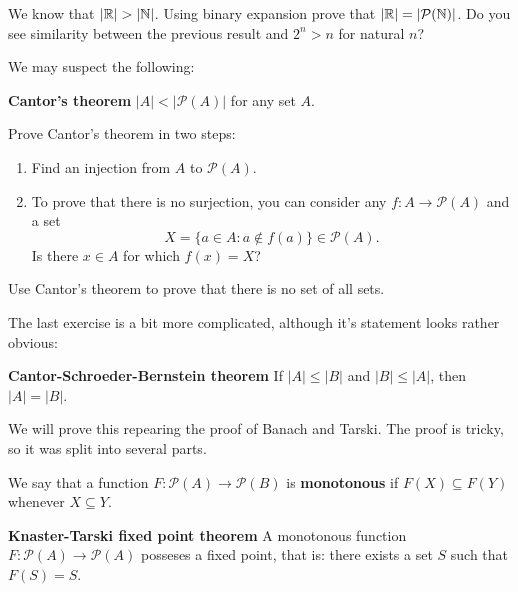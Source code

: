 \begin{exercise}
	We know that $|\mathbb R| > |\mathbb N|$. Using binary expansion prove that $|\mathbb R|=|\mathcal P(\mathbb N)|$. Do you see similarity between the previous result and $2^n > n$ for natural $n$?
\end{exercise}

We may suspect the following:

\begin{theorem}
\textbf{Cantor's theorem} $|A| < \left|\mathcal P(A)\right|$ for any set $A$.
\end{theorem}

\begin{exercise}
	Prove Cantor's theorem in two steps:
  \begin{enumerate}
    \item Find an injection from $A$ to $\mathcal P(A)$.
    \item To prove that there is no surjection, you can consider any $f:A\to \mathcal P(A)$ and a set
    $$X=\{a\in A : a\notin f(a)\}\in \mathcal P(A).$$
    Is there $x\in A$ for which $f(x)=X$?
  \end{enumerate}
\end{exercise}

\begin{exercise}
	Use Cantor's theorem to prove that there is no set of all sets.
\end{exercise}

The last exercise is a bit more complicated, although it's statement looks rather obvious:

\begin{theorem}
	\textbf{Cantor-Schroeder-Bernstein theorem} If $|A|\le|B|$ and $|B|\le |A|$, then $|A|=|B|$.
\end{theorem}

We will prove this repearing the proof of Banach and Tarski. The proof is tricky, so it was split into several parts.

\begin{definition}
  We say that a function $F: \mathcal P(A)\to \mathcal P(B)$ is \textbf{monotonous} if $F(X)\subseteq F(Y)$ whenever $X\subseteq Y$.
\end{definition}

\begin{theorem}
  \textbf{Knaster-Tarski fixed point theorem} A monotonous function $F: \mathcal P(A)\to \mathcal P(A)$ posseses a fixed point, that is: there exists a set $S$ such that $F(S)=S$.
\end{theorem}

